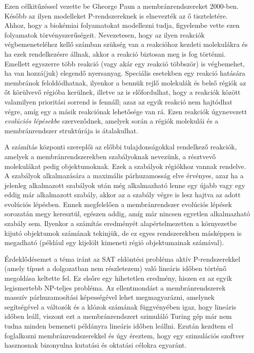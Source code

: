 Ezen célkitűzéssel vezette be Gheorge Paun a membránrendszereket 2000-ben. Később az ilyen modelleket P-rendszereknek is elnevezték az ő tiszteletére. Ahhoz, hogy a biokémiai folyamatokat modellezni tudja, figyelembe vette ezen folyamatok törvényszerűségeit. Nevezetesen, hogy az ilyen reakciók végbemeneteléhez kellő számban szükség van a reakcióhoz kezdeti molekulákra és ha ezek rendelkezésre állnak, akkor a reakció biztosan meg is fog történni. Emellett egyszerre több reakció (vagy akár egy reakció többször) is végbemehet, ha van hozzá(juk) elegendő nyersanyag. Speciális esetekben egy reakció hatására membránok feloldódhatnak, ilyenkor a bennük rejlő molekulák és belső régiók az őt körülvevő régióba kerülnek, illetve az is előfordulhat, hogy a reakciók között valamilyen prioritási sorrend is fennáll; azaz az egyik reakció nem hajtódhat végre, amíg egy a másik reakciónak lehetősége van rá. Ezen reakciók úgynevezett \textit{evolúciós lépésekbe} szerveződnek, amelyek során a régiók molekulái és a membránrendszer struktúrája is átalakulhat.

A számítás központi szereplői az előbbi tulajdonságokkal rendelkező reakciók, amelyek a membránrendszerekben szabályoknak nevezünk, a résztvevő molekulákat pedig objektumoknak. Ezek a szabályok régiókhoz vannak rendelve. A szabályok alkalmazására a maximális párhuzamosság elve érvényes, azaz ha a jelenleg alkalmazott szabályok után még alkalmazható lenne egy újabb vagy egy eddig már alkalmazott szabály, akkor az a szabály végre is lesz hajtva az adott evolúciós lépésben. Ennek megfelelően a membránrendszer evolúciós lépések sorozatán megy keresztül, egészen addig, amíg már nincsen egyetlen alkalmazható szabály sem. Ilyenkor a számítás eredményét alapértelmezetten a környezetbe kijutó objektumok számának tekinjük, de ez egyes rendszerekben másképpen is megadható (például egy kijelölt kimeneti régió objektumainak számával).

Érdeklődésemet a téma iránt az SAT eldöntési probléma aktív P-rendszerekkel (amely típust a dolgozatban nem részletezem) való lineáris időben történő megoldása keltette fel. Ez elsőre egy hihetetlen eredmény, hiszen ez az egyik legismertebb NP-teljes probléma. Az ellentmondást a membránrendszerek masszív párhuzamosítási képességével lehet megmagyarázni, amelynek segítségével a változók és a klózok számának függvényében igaz, hogy lineáris időben leáll, viszont ezt a membránrendszert szimuláló Turing gép már nem tudna minden bemeneti példányra lineáris időben leállni. Ezután kezdtem el foglalkozni membránrendszerekkel és úgy éreztem, hogy egy szimulációs szoftver hasznosnak bizonyulna kutatási és oktatási célokra egyaránt.

